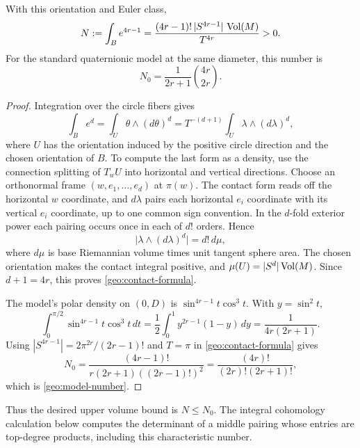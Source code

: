 \begin{proposition}\label{geo:contact}
With this orientation and Euler class,
\begin{equation}\label{geo:contact-formula}
 N:=\int_B e^{4r-1}
   =\frac{(4r-1)!\,|S^{4r-1}|\,\operatorname{Vol}(M)}{T^{4r}}>0.
\end{equation}
For the standard quaternionic model at the same diameter, this
number is
\begin{equation}\label{geo:model-number}
 N_0=\frac{1}{2r+1}\binom{4r}{2r}.
\end{equation}
\end{proposition}

\begin{proof}
Integration over the circle fibers gives
\[
 \int_Be^d
 =\int_U\theta\wedge(d\theta)^d
 =T^{-(d+1)}\int_U\lambda\wedge(d\lambda)^d,
\]
where $U$ has the orientation induced by the positive circle
direction and the chosen orientation of $B$.
To compute the last form as a density, use the connection splitting
of $T_wU$ into horizontal and vertical directions.  Choose an
orthonormal frame $(w,e_1,\ldots,e_d)$ at $\pi(w)$.
The contact form reads off the horizontal $w$ coordinate, and
$d\lambda$ pairs each horizontal $e_i$ coordinate with its vertical
$e_i$ coordinate, up to one common sign convention.
In the $d$-fold exterior power each pairing occurs once in each of
$d!$ orders.  Hence
\[
 \big|\lambda\wedge(d\lambda)^d\big|=d!\,d\mu,
\]
where $d\mu$ is base Riemannian volume times unit tangent sphere
area.  The chosen orientation makes the contact integral positive,
and $\mu(U)=|S^d|\operatorname{Vol}(M)$.  Since $d+1=4r$, this proves
\eqref{geo:contact-formula}.

The model's polar density on $(0,D)$ is
$\sin^{4r-1}t\cos^3t$.  With $y=\sin^2t$,
\[
 \int_0^{\pi/2}\sin^{4r-1}t\cos^3t\,dt
 =\frac12\int_0^1 y^{2r-1}(1-y)\,dy
 =\frac{1}{4r(2r+1)}.
\]
Using $|S^{4r-1}|=2\pi^{2r}/(2r-1)!$ and $T=\pi$ in
\eqref{geo:contact-formula} gives
\[
 N_0=\frac{(4r-1)!}{r(2r+1)((2r-1)!)^2}
     =\frac{(4r)!}{(2r)!(2r+1)!},
\]
which is \eqref{geo:model-number}.
\end{proof}

Thus the desired upper volume bound is $N\le N_0$.  The integral
cohomology calculation below computes the determinant of a middle
pairing whose entries are top-degree products, including this
characteristic number.

